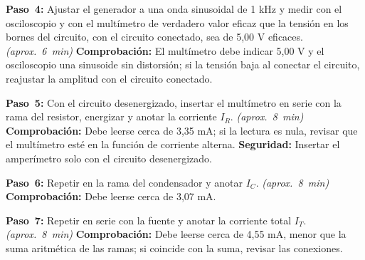 \documentclass[12pt]{article}
\begin{document}
\begin{pasos}
  \item \textbf{Paso~4:} Ajustar el generador a una onda sinusoidal de 1 kHz y medir con el osciloscopio y con el multímetro de verdadero valor eficaz que la tensión en los bornes del circuito, con el circuito conectado, sea de 5,00 V eficaces. \emph{(aprox.~\SI{6}{\minute})} \textbf{Comprobación:} El multímetro debe indicar 5,00 V y el osciloscopio una sinusoide sin distorsión; si la tensión baja al conectar el circuito, reajustar la amplitud con el circuito conectado.
  \item \textbf{Paso~5:} Con el circuito desenergizado, insertar el multímetro en serie con la rama del resistor, energizar y anotar la corriente $I_R$. \emph{(aprox.~\SI{8}{\minute})} \textbf{Comprobación:} Debe leerse cerca de 3,35 mA; si la lectura es nula, revisar que el multímetro esté en la función de corriente alterna. \textbf{Seguridad:} Insertar el amperímetro solo con el circuito desenergizado.
  \item \textbf{Paso~6:} Repetir en la rama del condensador y anotar $I_C$. \emph{(aprox.~\SI{8}{\minute})} \textbf{Comprobación:} Debe leerse cerca de 3,07 mA.
  \item \textbf{Paso~7:} Repetir en serie con la fuente y anotar la corriente total $I_T$. \emph{(aprox.~\SI{8}{\minute})} \textbf{Comprobación:} Debe leerse cerca de 4,55 mA, menor que la suma aritmética de las ramas; si coincide con la suma, revisar las conexiones.
\end{pasos}
\end{document}
